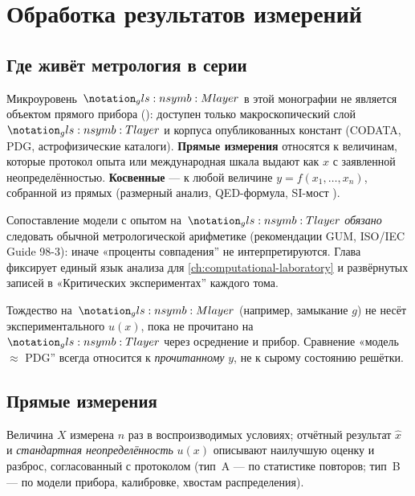 \chapter{Обработка результатов измерений}
\label{ch:measurement-processing}

\section{Где живёт метрология в серии}
\label{sec:metrology-layer}

Микроуровень~$\Mlayer$ в этой монографии не является объектом прямого прибора
(): доступен только макроскопический слой~$\Tlayer$ и корпуса
опубликованных констант (CODATA, PDG, астрофизические каталоги).
\textbf{Прямые измерения} относятся к величинам, которые протокол опыта
или международная шкала выдают как $x$ с заявленной неопределённостью.
\textbf{Косвенные} --- к любой величине $y=f(x_1,\ldots,x_n)$, собранной из прямых
(размерный анализ, QED-формула, SI-мост ).

Сопоставление модели с опытом на~$\Tlayer$ \emph{обязано} следовать обычной
метрологической арифметике (рекомендации GUM, ISO/IEC Guide 98-3):
иначе «проценты совпадения'' не интерпретируются.
Глава фиксирует единый язык анализа для \cref{ch:computational-laboratory}
и развёрнутых записей в «Критических экспериментах'' каждого тома.

\begin{remark}
Тождество на~$\Mlayer$ (например, замыкание $g$) не несёт экспериментального $u(x)$,
пока не прочитано на~$\Tlayer$ через осреднение и прибор.
Сравнение «модель $\approx$ PDG'' всегда относится к \emph{прочитанному} $y$,
не к сырому состоянию решётки.
\end{remark}

\section{Прямые измерения}
\label{sec:direct-measurement}

\begin{definition}
Величина $X$ измерена $n$ раз в воспроизводимых условиях;
отчётный результат $\hat x$ и \emph{стандартная неопределённость} $u(x)$
описывают наилучшую оценку и разброс, согласованный с протоколом
(тип~A --- по статистике повторов; тип~B --- по модели прибора, калибровке, хвостам распределения).
\end{definition}


